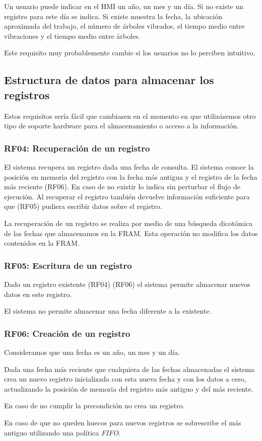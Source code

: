 Un usuario puede indicar en el HMI un año, un mes y un día.
Si no existe un registro para este día se indica.
Si existe muestra la fecha, la ubicación aproximada del trabajo,
el número de árboles vibrados, el tiempo medio entre vibraciones
y el tiempo medio entre árboles.

Este requisito muy probablemente cambie si los usuarios no
lo perciben intuitivo.

\subsection{Estructura de datos para almacenar los registros}

Estos requisitos sería fácil que cambiasen en el momento en que
utilizásemos otro tipo de soporte hardware para el almacenamiento
o acceso a la información.

\subsubsection{RF04: Recuperación de un registro}

El sistema recupera un registro dada una fecha de consulta.
El sistema conoce la posición en memoria del registro con la fecha
más antigua y el registro de la fecha más reciente (RF06).
En caso de no existir lo indica sin perturbar el flujo de ejecución.
Al recuperar el registro también devuelve información suficiente para
que (RF05) pudiera escribir datos sobre el registro.

La recuperación de un registro se realiza por medio de una búsqueda
dicotómica de las fechas que almacenamos en la FRAM.
Esta operación no modifica los datos contenidos en la FRAM.

\subsubsection{RF05: Escritura de un registro}

Dado un registro existente (RF04) (RF06) el sistema permite almacenar nuevos
datos en este registro.

El sistema no permite almacenar una fecha diferente a la existente.

\subsubsection{RF06: Creación de un registro}

Consideramos que una fecha es un año, un mes y un día.

Dada una fecha más reciente que cualquiera de las fechas almacenadas
el sistema crea un nuevo registro inicializada con esta nueva fecha
y con los datos a cero, actualizando la posición de memoria del registro
más antiguo y del más reciente.

En caso de no cumplir la precondición no crea un registro.

En caso de que no queden huecos para nuevos registros se sobrescribe
el más antiguo utilizando una política \textit{FIFO}.
